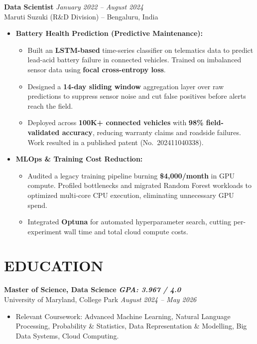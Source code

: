 \documentclass[9pt]{article}
\begin{document}
\vspace{2pt}

\textbf{Data Scientist} \hfill \textit{January 2022 -- August 2024}\\
Maruti Suzuki (R\&D Division) -- Bengaluru, India
\begin{itemize}
    \item \textbf{Battery Health Prediction (Predictive Maintenance):}
    \begin{itemize}
        \item Built an \textbf{LSTM-based} time-series classifier on telematics data to predict lead-acid battery failure in connected vehicles. Trained on imbalanced sensor data using \textbf{focal cross-entropy loss}.
        \item Designed a \textbf{14-day sliding window} aggregation layer over raw predictions to suppress sensor noise and cut false positives before alerts reach the field.
        \item Deployed across \textbf{100K+ connected vehicles} with \textbf{98\% field-validated accuracy}, reducing warranty claims and roadside failures. Work resulted in a published patent (No.~202411040338).
    \end{itemize}
    \item \textbf{MLOps \& Training Cost Reduction:}
    \begin{itemize}
        \item Audited a legacy training pipeline burning \textbf{\$4,000/month} in GPU compute. Profiled bottlenecks and migrated Random Forest workloads to optimized multi-core CPU execution, eliminating unnecessary GPU spend.
        \item Integrated \textbf{Optuna} for automated hyperparameter search, cutting per-experiment wall time and total cloud compute costs.
    \end{itemize}
\end{itemize}

\vspace{3pt}
\section*{EDUCATION}

\textbf{Master of Science, Data Science} \hfill \textbf{\textit{GPA: 3.967 / 4.0}}\\
University of Maryland, College Park \hfill \textit{August 2024 -- May 2026}
\begin{itemize}
    \item Relevant Coursework: Advanced Machine Learning, Natural Language Processing, Probability \& Statistics, Data Representation \& Modelling, Big Data Systems, Cloud Computing.
\end{itemize}
\vspace{3pt}
\end{document}
